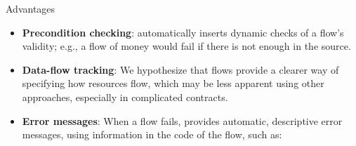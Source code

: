 \documentclass[usenames, dvipsnames, final]{beamer}
\newlength{\colwidth}
\begin{document}
\begin{frame}[t]
\begin{columns}[t]
\begin{column}{\colwidth}
    \begin{alertblock}{Advantages}
        \begin{itemize}
            \item \textbf{Precondition checking}: \langName automatically inserts dynamic checks of a flow's validity; e.g., a flow of money would fail if there is not enough in the source. %
            \item \textbf{Data-flow tracking}: We hypothesize that flows provide a clearer way of specifying how resources flow, which may be less apparent using other approaches, especially in complicated contracts. %
            \item \textbf{Error messages}: When a flow fails, \langName provides automatic, descriptive error messages, using information in the code of the flow, such as:
        \end{itemize}
    \end{alertblock}


\end{column}
\end{columns}
\end{frame}
\end{document}
